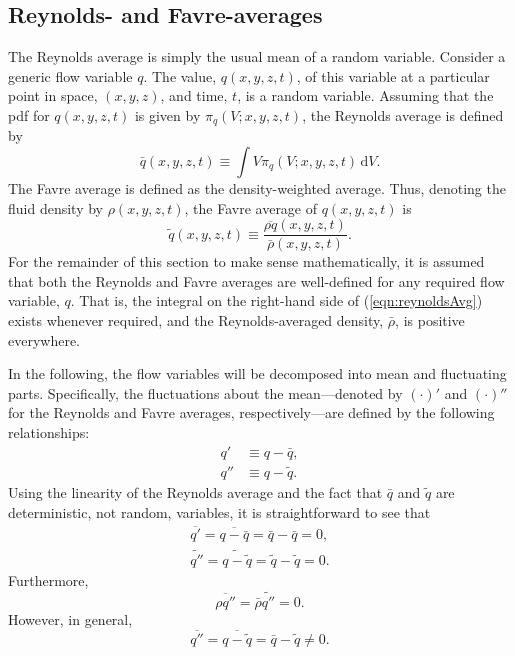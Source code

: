 \documentclass[letterpaper,11pt,nointlimits,reqno]{amsart}
\begin{document}
\subsection{Reynolds- and Favre-averages}
The Reynolds average is simply the usual mean of a random variable.  Consider a
generic flow variable $q$.  The value, $q(x, y, z, t)$, of this variable at
a particular point in space, $(x, y, z)$, and time, $t$, is a random variable.
Assuming that the pdf for $q(x, y, z, t)$ is given by $\pi_q(V; x, y, z,
t)$, the Reynolds average is defined by
%
\begin{equation}
\label{eqn:reynoldsAvg}
\bar{q}(x, y, z, t) \equiv \int V \pi_q(V; x, y, z, t) \,\mathrm{d} V.
\end{equation}
%
The Favre average is defined as the density-weighted average.  Thus,
denoting the fluid density by $\rho(x,y,z, t)$, the Favre average of
$q(x,y,z, t)$ is
%
\begin{equation*}
\tilde{q}(x,y,z, t) \equiv \frac{ \overline{\rho q}(x,y,z, t) }{ \bar{\rho}(x,y,z, t) }.
\end{equation*}
%
For the remainder of this section to make sense mathematically, it is
assumed that both the Reynolds and Favre averages are well-defined for
any required flow variable, $q$.  That is, the integral on the
right-hand side of (\ref{eqn:reynoldsAvg}) exists whenever required,
and the Reynolds-averaged density, $\bar{\rho}$, is positive
everywhere.

In the following, the flow variables will be decomposed into mean and
fluctuating parts.  Specifically, the fluctuations about the
mean---denoted by $(\cdot)'$ and $(\cdot)''$ for the Reynolds and
Favre averages, respectively---are defined by the following
relationships:
%
\begin{align*}
q' &\equiv q - \bar{q}, \\
q'' &\equiv q - \tilde{q}.
\end{align*}
%
Using the linearity of the Reynolds average and the fact that
$\bar{q}$ and $\tilde{q}$ are deterministic, not random, variables, it
is straightforward to see that
%
\begin{gather*}
\overline{q'} = \overline{q - \bar{q}} = \bar{q} - \bar{q} =  0, \\
\widetilde{q''} = \widetilde{q - \tilde{q}} = \tilde{q} - \tilde{q} = 0.
\end{gather*}
%
Furthermore,
%
\begin{equation*}
\overline{\rho q''} = \bar{\rho} \widetilde{q''} = 0.
\end{equation*}
%
However, in general,
%
\begin{equation*}
\overline{q''} = \overline{q - \tilde{q}} = \bar{q} - \tilde{q} \neq 0.
\end{equation*}
%
\end{document}
